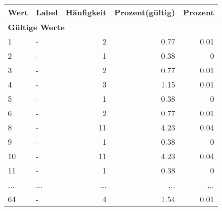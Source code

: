      \begin{longtable}{lXrrr}
     \toprule
     \textbf{Wert} & \textbf{Label} & \textbf{Häufigkeit} & \textbf{Prozent(gültig)} & \textbf{Prozent} \\
     \endhead
     \midrule
     \multicolumn{5}{l}{\textbf{Gültige Werte}}\\
        1 & \multicolumn{1}{X}{-} & %
          \num{2} &
          \num[round-mode=places,round-precision=2]{0.77} &
          \num[round-mode=places,round-precision=2]{0.01} \\
        2 & \multicolumn{1}{X}{-} & %
          \num{1} &
          \num[round-mode=places,round-precision=2]{0.38} &
          \num[round-mode=places,round-precision=2]{0} \\
        3 & \multicolumn{1}{X}{-} & %
          \num{2} &
          \num[round-mode=places,round-precision=2]{0.77} &
          \num[round-mode=places,round-precision=2]{0.01} \\
        4 & \multicolumn{1}{X}{-} & %
          \num{3} &
          \num[round-mode=places,round-precision=2]{1.15} &
          \num[round-mode=places,round-precision=2]{0.01} \\
        5 & \multicolumn{1}{X}{-} & %
          \num{1} &
          \num[round-mode=places,round-precision=2]{0.38} &
          \num[round-mode=places,round-precision=2]{0} \\
        6 & \multicolumn{1}{X}{-} & %
          \num{2} &
          \num[round-mode=places,round-precision=2]{0.77} &
          \num[round-mode=places,round-precision=2]{0.01} \\
        8 & \multicolumn{1}{X}{-} & %
          \num{11} &
          \num[round-mode=places,round-precision=2]{4.23} &
          \num[round-mode=places,round-precision=2]{0.04} \\
        9 & \multicolumn{1}{X}{-} & %
          \num{1} &
          \num[round-mode=places,round-precision=2]{0.38} &
          \num[round-mode=places,round-precision=2]{0} \\
        10 & \multicolumn{1}{X}{-} & %
          \num{11} &
          \num[round-mode=places,round-precision=2]{4.23} &
          \num[round-mode=places,round-precision=2]{0.04} \\
        11 & \multicolumn{1}{X}{-} & %
          \num{1} &
          \num[round-mode=places,round-precision=2]{0.38} &
          \num[round-mode=places,round-precision=2]{0} \\
       ... & ... & ... & ... & ... \\
        64 & \multicolumn{1}{X}{-} & %
          \num{4} &
          \num[round-mode=places,round-precision=2]{1.54} &
          \num[round-mode=places,round-precision=2]{0.01} \\


\end{longtable}

